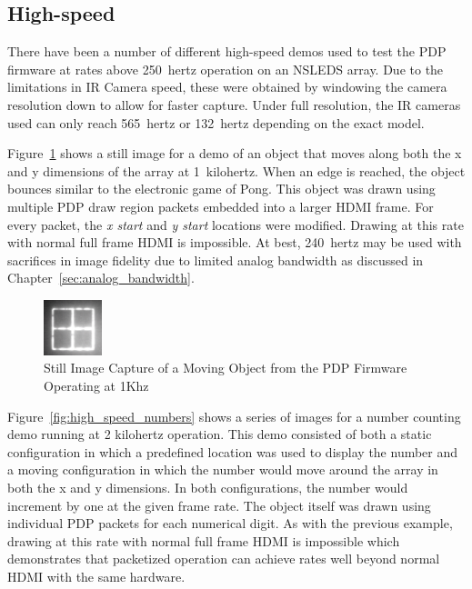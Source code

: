     \subsection{High-speed}
        There have been a number of different high-speed demos used to test the PDP firmware at rates above \mbox{250 hertz} operation on an NSLEDS array. Due to the limitations in IR Camera speed, these were obtained by windowing the camera resolution down to allow for faster capture. Under full resolution, the IR cameras used can only reach \mbox{565 hertz} or \mbox{132 hertz} depending on the exact model.

        Figure~\ref{fig:high_speed_object} shows a still image for a demo of an object that moves along both the x and y dimensions of the array at \mbox{1 kilohertz}. When an edge is reached, the object bounces similar to the electronic game of Pong\cite{Alcorn1972}. This object was drawn using multiple PDP draw region packets embedded into a larger HDMI frame. For every packet, the {\it x start} and {\it y start} locations were modified. Drawing at this rate with normal full frame HDMI is impossible. At best, \mbox{240 hertz} may be used with sacrifices in image fidelity due to limited analog bandwidth as discussed in Chapter~\ref{sec:analog_bandwidth}.

        \begin{figure}[t]
            \centering
            \includegraphics[width=0.15\textwidth]{fig/high_speed_object.png}
            \caption{Still Image Capture of a Moving Object from the PDP Firmware Operating at 1Khz}
            \label{fig:high_speed_object}
        \end{figure}

        Figure~\ref{fig:high_speed_numbers} shows a series of images for a number counting demo running at {2 kilohertz} operation. This demo consisted of both a static configuration in which a predefined location was used to display the number and a moving configuration in which the number would move around the array in both the x and y dimensions. In both configurations, the number would increment by one at the given frame rate. The object itself was drawn using individual PDP packets for each numerical digit. As with the previous example, drawing at this rate with normal full frame HDMI is impossible which demonstrates that packetized operation can achieve rates well beyond normal HDMI with the same hardware.

